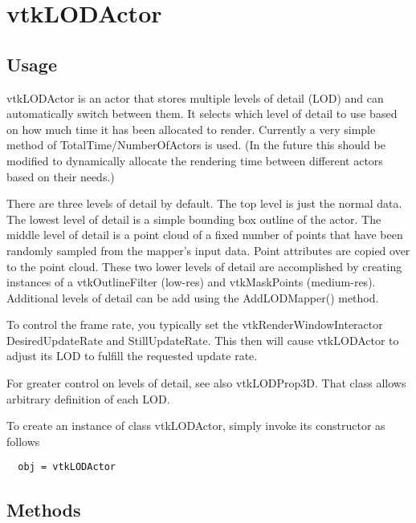 \section{vtkLODActor}

\subsection{Usage}

 vtkLODActor is an actor that stores multiple levels of detail (LOD) and
 can automatically switch between them. It selects which level of detail to
 use based on how much time it has been allocated to render.  Currently a
 very simple method of TotalTime/NumberOfActors is used.  (In the future
 this should be modified to dynamically allocate the rendering time between
 different actors based on their needs.)

 There are three levels of detail by default. The top level is just the
 normal data.  The lowest level of detail is a simple bounding box outline
 of the actor. The middle level of detail is a point cloud of a fixed
 number of points that have been randomly sampled from the mapper's input
 data.  Point attributes are copied over to the point cloud.  These two
 lower levels of detail are accomplished by creating instances of a
 vtkOutlineFilter (low-res) and vtkMaskPoints (medium-res). Additional
 levels of detail can be add using the AddLODMapper() method.

 To control the frame rate, you typically set the vtkRenderWindowInteractor
 DesiredUpdateRate and StillUpdateRate. This then will cause vtkLODActor
 to adjust its LOD to fulfill the requested update rate.

 For greater control on levels of detail, see also vtkLODProp3D. That
 class allows arbitrary definition of each LOD.

To create an instance of class vtkLODActor, simply
invoke its constructor as follows
\begin{verbatim}
  obj = vtkLODActor
\end{verbatim}
\subsection{Methods}

